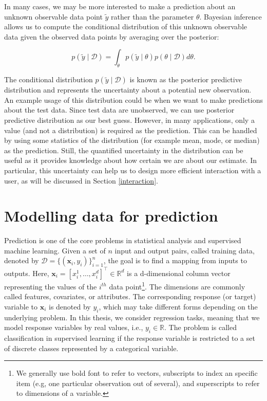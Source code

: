 \documentclass[dissertation,math,vertlayout,pdfa,colorlinks]{aaltoseries}
\newcommand{\bD}{\mathcal{D}}
\newcommand{\tp}{^{\top}}
\begin{document}
In many cases, we may be more interested to make a prediction about an unknown observable data point $\tilde{y}$ rather than the parameter $\theta$. Bayesian inference allows us to compute the conditional distribution of this unknown observable data given the observed data points by averaging over the posterior: 

\begin{equation}
p(\tilde{y} \mid\bD ) = \int_{\theta} p(\tilde{y}  \mid \theta)p(\theta \mid \bD)d\theta. 
\end{equation}

\noindent The conditional distribution $p(\tilde{y} \mid \bD)$ is known as the posterior predictive distribution and represents the uncertainty about a potential new observation. An example usage of this distribution could be when we want to make predictions about the test data. Since test data are unobserved, we can use posterior predictive distribution as our best guess. However, in many applications, only a value (and not a distribution) is required as the prediction. This can be handled by using some statistics of the distribution (for example mean, mode, or median) as the prediction. Still, the quantified uncertainty in the distribution can be useful as it provides knowledge about how certain we are about our estimate. In particular, this uncertainty can help us to design more efficient interaction with a user, as will be discussed in Section \ref{interaction}.

	

\section{Modelling data for prediction} \label{prob_model_data}

Prediction is one of the core problems in statistical analysis and supervised machine learning. Given a set of $n$ input and output pairs, called training data, denoted by $\bD= \{(\bm{x}_i,y_i)\}_{i=1}^{n}$, the goal is to find a mapping from inputs to outputs. Here, $\bm{x}_i = [x_i^1,\ldots,x_i^d]\tp \in \mathbb{R}^d$ is a d-dimensional column vector representing the values of the $i^{th}$ data point\footnote{We generally use bold font to refer to vectors, subscripts to index an specific item (e.g, one particular observation out of several), and superscripts to refer to dimensions of a variable.}. The dimensions are commonly called features, covariates, or attributes. The corresponding response (or target) variable to $\bm{x}_i$ is denoted by $y_i$, which may take different forms depending on the underlying problem. In this thesis, we consider regression tasks, meaning that we model response variables by real values, i.e., $y_i \in \mathbb{R}$. The problem is called classification in supervised learning if the response variable is restricted to a set of discrete classes represented by a categorical variable. 
\end{document}
